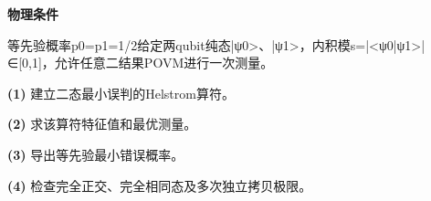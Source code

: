 \textbf{物理条件}\par 等先验概率p0=p1=1/2给定两qubit纯态|ψ0>、|ψ1>，内积模s=|<ψ0|ψ1>|∈[0,1]，允许任意二结果POVM进行一次测量。
\par\noindent\textbf{(1)} 建立二态最小误判的Helstrom算符。
\par\noindent\textbf{(2)} 求该算符特征值和最优测量。
\par\noindent\textbf{(3)} 导出等先验最小错误概率。
\par\noindent\textbf{(4)} 检查完全正交、完全相同态及多次独立拷贝极限。
